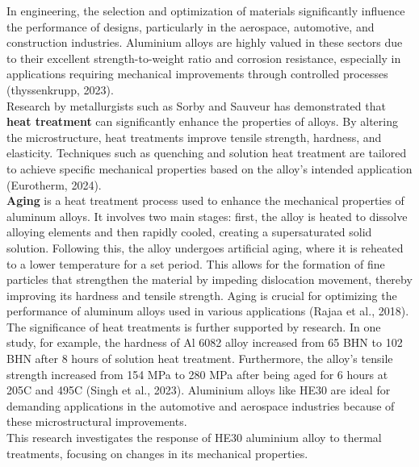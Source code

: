 \documentclass{article}
\begin{document}
In engineering, the selection and optimization of materials significantly influence the performance of designs, particularly in the aerospace, automotive, and construction industries. Aluminium alloys are highly valued in these sectors due to their excellent strength-to-weight ratio and corrosion resistance, especially in applications requiring mechanical improvements through controlled processes (thyssenkrupp, 2023).\\[8pt]
Research by metallurgists such as Sorby and Sauveur has demonstrated that \textbf{heat treatment} can significantly enhance the properties of alloys. By altering the microstructure, heat treatments improve tensile strength, hardness, and elasticity. Techniques such as quenching and solution heat treatment are tailored to achieve specific mechanical properties based on the alloy’s intended application (Eurotherm, 2024).\\[8pt] 
\textbf{Aging} is a heat treatment process used to enhance the mechanical properties of aluminum alloys. It involves two main stages: first, the alloy is heated to dissolve alloying elements and then rapidly cooled, creating a supersaturated solid solution. Following this, the alloy undergoes artificial aging, where it is reheated to a lower temperature for a set period. This allows for the formation of fine particles that strengthen the material by impeding dislocation movement, thereby improving its hardness and tensile strength. Aging is crucial for optimizing the performance of aluminum alloys used in various applications (Rajaa et al., 2018).\\[8pt]
The significance of heat treatments is further supported by research. In one study, for example, the hardness of Al 6082 alloy increased from 65 BHN to 102 BHN after 8 hours of solution heat treatment. Furthermore, the alloy's tensile strength increased from 154 MPa to 280 MPa after being aged for 6 hours at 205\textdegree C and 495\textdegree C (Singh et al., 2023). Aluminium alloys like HE30 are ideal for demanding applications in the automotive and aerospace industries because of these microstructural improvements.\\[8pt]
This research investigates the response of HE30 aluminium alloy to thermal treatments, focusing on changes in its mechanical properties.

\newpage\vspace*{-20pt}
\end{document}
